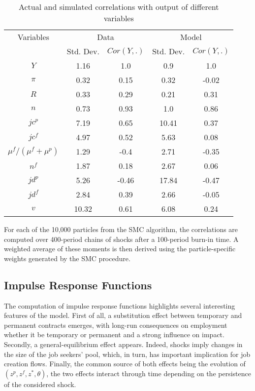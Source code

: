 \begin{table}[H]
\begin{center}
\begin{tabular}{ccccc}
\toprule
 Variables & \multicolumn{2}{c}{Data} & \multicolumn{2}{c}{Model} \\ \cmidrule(lr){2-3} \cmidrule(lr){4-5} & Std. Dev. & $Cor\left( Y, . \right)$ & Std. Dev. & $Cor\left( Y, . \right)$ \\ \midrule 
$Y$ & 1.16 & 1.0 & 0.9 & 1.0 \\ 
$\pi$ & 0.32 & 0.15 & 0.32 & -0.02 \\ 
$R$ & 0.33 & 0.29 & 0.21 & 0.31 \\ 
$n$ & 0.73 & 0.93 & 1.0 & 0.86 \\ 
$jc^p$ & 7.19 & 0.65 & 10.41 & 0.37 \\ 
$jc^f$ & 4.97 & 0.52 & 5.63 & 0.08 \\ 
$\mu^f / \left( \mu^f + \mu^p \right)$ & 1.29 & -0.4 & 2.71 & -0.35 \\ 
$n^f$ & 1.87 & 0.18 & 2.67 & 0.06 \\ 
$jd^p$ & 5.26 & -0.46 & 17.84 & -0.47 \\ 
$jd^f$ & 2.84 & 0.39 & 2.66 & -0.05 \\ 
$v$ & 10.32 & 0.61 & 6.08 & 0.24 \\ 
\bottomrule
\end{tabular}
\caption{Actual and simulated correlations with output of different variables}
\end{center}
\begin{flushleft}
\footnotesize{For each of the 10,000 particles from the SMC algorithm, the correlations are computed over 400-period chains of shocks after a 100-period burn-in time. A weighted average of these moments is then derived using the particle-specific weights generated by the SMC procedure.}
\end{flushleft}
\end{table}

\subsection{Impulse Response Functions}

The computation of impulse response functions highlights several interesting features of the model. First of all, a substitution effect between temporary and permanent contracts emerges, with long-run consequences on employment whether it be temporary or permanent and a strong influence on impact. Secondly, a general-equilibrium effect appears. Indeed, shocks imply changes in the size of the job seekers' pool, which, in turn, has important implication for job creation flows. Finally, the common source of both effects being the evolution of $\left( z^p, z^f, z^*, \theta\right)$, the two effects interact through time depending on the persistence of the considered shock.


